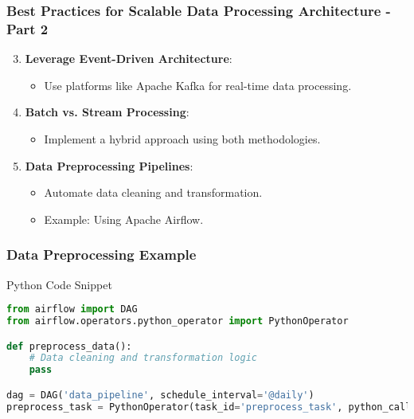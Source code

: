 \documentclass[aspectratio=169]{beamer}
\begin{document}
\begin{frame}
    \frametitle{Best Practices for Scalable Data Processing Architecture - Part 2}
    \begin{enumerate}
        \setcounter{enumi}{2}
        \item \textbf{Leverage Event-Driven Architecture}:
            \begin{itemize}
                \item Use platforms like Apache Kafka for real-time data processing.
            \end{itemize}
        \item \textbf{Batch vs. Stream Processing}:
            \begin{itemize}
                \item Implement a hybrid approach using both methodologies.
            \end{itemize}
        \item \textbf{Data Preprocessing Pipelines}:
            \begin{itemize}
                \item Automate data cleaning and transformation.
                \item Example: Using Apache Airflow.
            \end{itemize}
    \end{enumerate}
\end{frame}

\begin{frame}[fragile]
    \frametitle{Data Preprocessing Example}
    \begin{block}{Python Code Snippet}
    \begin{lstlisting}[language=Python]
from airflow import DAG
from airflow.operators.python_operator import PythonOperator

def preprocess_data():
    # Data cleaning and transformation logic
    pass

dag = DAG('data_pipeline', schedule_interval='@daily')
preprocess_task = PythonOperator(task_id='preprocess_task', python_callable=preprocess_data, dag=dag)
    \end{lstlisting}
    \end{block}
\end{frame}
\end{document}
